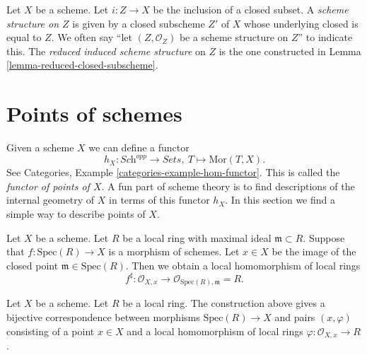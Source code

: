 \begin{definition}
\label{definition-reduced-induced-scheme}
Let $X$ be a scheme. Let $i : Z \to X$ be the inclusion of a closed subset.
A {\it scheme structure on $Z$} is given by a closed subscheme $Z'$ of
$X$ whose underlying closed is equal to $Z$. We often say
``let $(Z, \mathcal{O}_Z)$ be a scheme structure on $Z$'' to
indicate this. The {\it reduced induced scheme structure}
on $Z$ is the one constructed in Lemma \ref{lemma-reduced-closed-subscheme}.
\end{definition}












\section{Points of schemes}
\label{section-points}

\noindent
Given a scheme $X$ we can define a functor
$$
h_X : \textit{Sch}^{opp}
\longrightarrow
\textit{Sets},\ 
T \longmapsto \text{Mor}(T, X).
$$
See Categories, Example \ref{categories-example-hom-functor}.
This is called the {\it functor of points of $X$}.
A fun part of scheme theory is to find descriptions of
the internal geometry of $X$ in terms of this functor $h_X$.
In this section we find a simple way to describe
points of $X$.

\medskip\noindent
Let $X$ be a scheme. Let $R$ be a local ring with maximal ideal
$\mathfrak m \subset R$. Suppose that $f : \text{Spec}(R) \to X$
is a morphism of schemes. Let $x \in X$ be the image of the closed point
$\mathfrak m \in \text{Spec}(R)$. Then we obtain a local homomorphism
of local rings
$$
f^\sharp :
\mathcal{O}_{X, x}
\longrightarrow
\mathcal{O}_{\text{Spec}(R), \mathfrak m} = R.
$$

\begin{lemma}
\label{lemma-morphism-from-spec-local-ring}
Let $X$ be a scheme. Let $R$ be a local ring.
The construction above gives a bijective correspondence
between morphisms $\text{Spec}(R) \to X$ and pairs
$(x, \varphi)$ consisting of a point $x \in X$ and
a local homomorphism of local rings $\varphi : \mathcal{O}_{X, x} \to R$.
\end{lemma}

